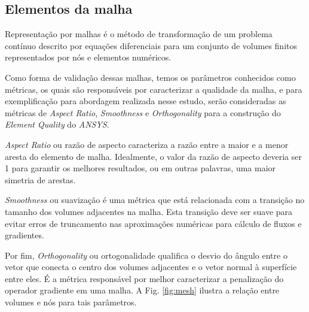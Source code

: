 \subsection{Elementos da malha}



Representação por malhas é o método de transformação de um problema contínuo descrito por equações diferenciais para um conjunto de volumes finitos representados por nós e elementos numéricos.

Como forma de validação dessas malhas, temos os parâmetros conhecidos como métricas, os quais são responsáveis por caracterizar a qualidade da malha, e para exemplificação para abordagem realizada nesse estudo, serão consideradas as métricas de \textit{Aspect Ratio}, \textit{Smoothness} e \textit{Orthogonality} \cite{luiz_malha} para a construção do \textit{Element Quality} do \textit{ANSYS}.

\textit{Aspect Ratio} ou razão de aspecto caracteriza a razão entre a maior e a menor aresta do elemento de malha. Idealmente, o valor da razão de aspecto deveria ser 1 para garantir os melhores resultados, ou em outras palavras, uma maior simetria de arestas.

\textit{Smoothness} ou suavização é uma métrica que está relacionada com a transição no tamanho dos volumes adjacentes na malha. Esta transição deve ser suave para evitar erros de truncamento nas aproximações numéricas para cálculo de fluxos e gradientes.

Por fim, \textit{Orthogonality} ou ortogonalidade qualifica o desvio do ângulo entre o vetor que conecta o centro dos volumes adjacentes e o vetor normal à superfície entre eles. É a métrica responsável por melhor caracterizar a penalização do operador gradiente em uma malha.
A Fig. \ref{fig:mesh} ilustra a relação entre volumes e nós para tais parâmetros.

